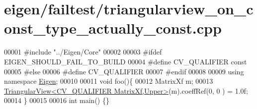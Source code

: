 \hypertarget{eigen_2failtest_2triangularview__on__const__type__actually__const_8cpp_source}{}\section{eigen/failtest/triangularview\+\_\+on\+\_\+const\+\_\+type\+\_\+actually\+\_\+const.cpp}
\label{eigen_2failtest_2triangularview__on__const__type__actually__const_8cpp_source}

\begin{DoxyCode}
00001 \textcolor{preprocessor}{#include "../Eigen/Core"}
00002 
00003 \textcolor{preprocessor}{#ifdef EIGEN\_SHOULD\_FAIL\_TO\_BUILD}
00004 \textcolor{preprocessor}{#define CV\_QUALIFIER const}
00005 \textcolor{preprocessor}{#else}
00006 \textcolor{preprocessor}{#define CV\_QUALIFIER}
00007 \textcolor{preprocessor}{#endif}
00008 
00009 \textcolor{keyword}{using namespace }\hyperlink{namespace_eigen}{Eigen};
00010 
00011 \textcolor{keywordtype}{void} foo()\{
00012     MatrixXf m;
00013     \hyperlink{group___core___module_class_eigen_1_1_triangular_view}{TriangularView<CV\_QUALIFIER MatrixXf,Upper>}(m).coeffRef(0, 0
      ) = 1.0f;
00014 \}
00015 
00016 \textcolor{keywordtype}{int} main() \{\}
\end{DoxyCode}
